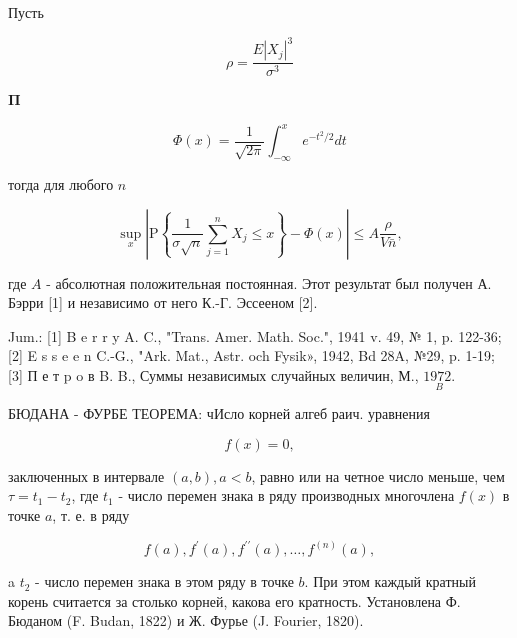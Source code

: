 \documentclass[10pt]{article}
\begin{document}
Пусть



\[

\rho=\frac{E\left|X_{j}\right|^{3}}{\sigma^{3}}

\]



$\mathbf{\Pi}$



\[

\Phi(x)=\frac{1}{\sqrt{2 \pi}} \int_{-\infty}^{x} e^{-t^{2} / 2} d t

\]



тогда для любого $n$



\[

\sup _{x}\left|\mathrm{P}\left\{\frac{1}{\sigma \sqrt{n}} \sum_{j=1}^{n} X_{j} \leqslant x\right\}-\Phi(x)\right| \leqslant A \frac{\rho}{V \bar{n}},

\]



где $A$ - абсолютная положительная постоянная. Этот результат был получен А. Бэрри [1] и независимо от него К.-Г. Эссееном [2].



Jum.: [1] B e r r y A. C., "Trans. Amer. Math. Soc.", 1941 v. 49, № 1, p. 122-36; [2] E s s e e n C.-G., "Ark. Mat., Astr. och Fysik», 1942, Bd 28A, №29, p. 1-19; [3] П е т p o в B. B., Суммы независимых случайных величин, М., $\underset{B}{1972 .}$



БЮДАНА - ФУРБЕ ТЕОРЕМА: чИсло корней алгеб раич. уравнения



\[

f(x)=0,

\]



заключенных в интервале $(a, b), a<b$, равно или на четное число меньше, чем $\tau=t_{1}-t_{2}$, где $t_{1}$ - число перемен знака в ряду производных многочлена $f(x)$ в точке $a$, т. е. в ряду



\[

f(a), f^{\prime}(a), f^{\prime \prime}(a), \ldots, f^{(n)}(a),

\]



a $t_{2}$ - число перемен знака в этом ряду в точке $b$. При этом каждый кратный корень считается за столько корней, какова его кратность. Установлена Ф. Бюданом (F. Budan, 1822) и Ж. Фурье (J. Fourier, 1820).
\end{document}
